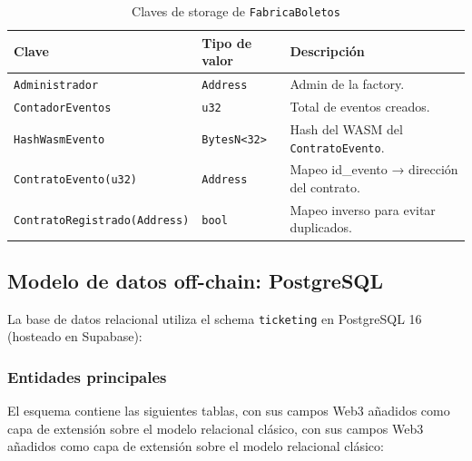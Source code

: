 \documentclass[12pt,oneside]{article}
\begin{document}
\begin{table}[htbp]
\centering
\caption{Claves de storage de \texttt{FabricaBoletos}}
\begin{tabularx}{\textwidth}{l l X}
\toprule
\textbf{Clave} & \textbf{Tipo de valor} & \textbf{Descripción} \\
\midrule
\texttt{Administrador} & \texttt{Address} & Admin de la factory. \\
\texttt{ContadorEventos} & \texttt{u32} & Total de eventos creados. \\
\texttt{HashWasmEvento} & \texttt{BytesN<32>} & Hash del WASM del \texttt{ContratoEvento}. \\
\texttt{ContratoEvento(u32)} & \texttt{Address} & Mapeo id\_evento → dirección del contrato. \\
\texttt{ContratoRegistrado(Address)} & \texttt{bool} & Mapeo inverso para evitar duplicados. \\
\bottomrule
\end{tabularx}
\end{table}

\FloatBarrier
\subsection{Modelo de datos off-chain: PostgreSQL}

La base de datos relacional utiliza el schema \texttt{ticketing} en PostgreSQL 16 (hosteado en Supabase):

\subsubsection{Entidades principales}

El esquema contiene las siguientes tablas, con sus campos Web3 añadidos como capa de extensión sobre el modelo relacional clásico, con sus campos Web3 añadidos como capa de extensión sobre el modelo relacional clásico:
\end{document}
